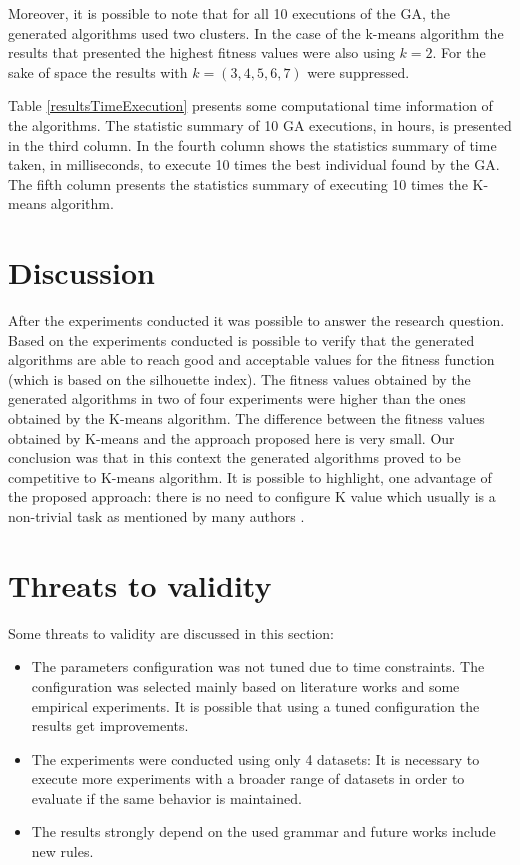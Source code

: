 \documentclass[journal]{IEEEtran}
\begin{document}
	Moreover, it is possible to note that for all 10 executions of the GA, the generated algorithms used two clusters. In the case of the k-means algorithm the results that presented the highest fitness values were also using $k=2$. For the sake of space the results with $k = (3,4,5,6,7)$ were suppressed.
	
	Table \ref{resultsTimeExecution} presents some computational time information of the algorithms. The statistic summary of 10 GA executions, in hours, is presented in the third column. In the fourth column shows the statistics summary of time taken, in milliseconds, to execute 10 times the best individual found by the GA. The fifth column presents the statistics summary of executing 10 times the K-means algorithm.
	
	
	
	\section{Discussion}
	\label{sec:discussion}
	
	After the experiments conducted it was possible to answer the research question. Based on the experiments conducted is possible to verify that the generated algorithms are able to reach good and acceptable values for the  fitness function (which is based on the silhouette index). The fitness values obtained by the generated algorithms in two of four experiments were higher than the ones obtained by the K-means algorithm. The difference between the fitness values obtained by K-means and the approach proposed here is very small. Our conclusion was that in this context the generated algorithms proved to be competitive to K-means algorithm. It is possible to highlight, one advantage of the proposed approach: there is no need to configure K value which usually is a non-trivial task as mentioned by many authors \cite{pham2005selection, yan2005methods, tibshirani2001estimating}.
	
	\section{Threats to validity} \label{sec:threats}
	
	Some threats to validity are discussed in this section:
	\begin{itemize}
		\item The parameters configuration was not tuned due to time constraints. The configuration was selected mainly based on literature works and some empirical experiments. It is possible that using a tuned configuration the results get improvements.
		\item The experiments were conducted using only 4 datasets: It is necessary to execute more experiments with a broader range of datasets in order to evaluate if the same behavior is maintained.
		\item The results strongly depend on the used grammar and future works include new rules.
	\end{itemize}
	
\end{document}
